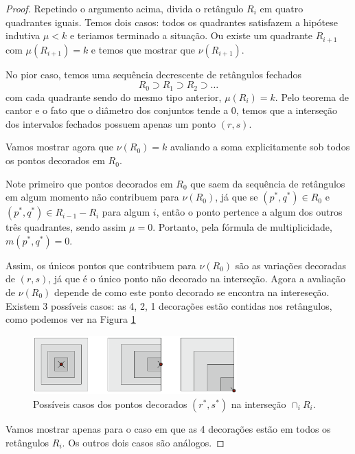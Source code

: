 \begin{proof}
Repetindo o argumento acima, divida o retângulo $R_i$ em quatro quadrantes iguais. Temos dois
casos: todos os quadrantes satisfazem a hipótese indutiva $\mu<k$ e teriamos terminado a situação.
Ou existe um quadrante $R_{i+1}$ com $\mu(R_{i+1})=k$ e temos que mostrar que $\nu(R_{i+1})$.

No pior caso, temos uma sequência decrescente de retângulos fechados
\begin{equation*}
    R_0 \supset R_1 \supset R_2 \supset \dots
\end{equation*}
com cada quadrante sendo do mesmo tipo anterior, $\mu(R_i) = k$. Pelo teorema de cantor e o fato
que o diâmetro dos conjuntos tende a $0$, temos que a interseção dos intervalos fechados possuem
apenas um ponto $(r,s)$.

Vamos mostrar agora que $\nu(R_0) = k$ avaliando a soma explicitamente sob todos os pontos decorados
em $R_0$.

Note primeiro que pontos decorados em $R_0$ que saem da sequência de retângulos em algum momento não
contribuem para $\nu(R_0)$, já que se $(p^*, q^*) \in R_0$ e $(p^*, q^*) \in R_{i-1} - R_i$ para 
algum $i$, então o ponto pertence a algum dos outros três quadrantes, sendo assim $\mu = 0$. 
Portanto, pela fórmula de multiplicidade, $m(p^*, q^*) = 0$. 

Assim, os únicos pontos que contribuem para $\nu(R_0)$ são as variações decoradas de $(r,s)$, já 
que é o único ponto não decorado na interseção. Agora a avaliação de $\nu(R_0)$ depende de como 
este ponto decorado se encontra na intereseção. Existem 3 possíveis casos: as 4, 2, 1 decorações
estão contidas nos retângulos, como podemos ver na Figura \ref{fig:proof_rect}

\begin{figure}[htpb!]
    \centering
    \includegraphics[width=0.7\textwidth]{images/proof_rect.png}
    \caption{Possíveis casos dos pontos decorados $(r^*, s^*)$ na interseção $\cap_i R_i$.}
    \label{fig:proof_rect}
\end{figure}

Vamos mostrar apenas para o caso em que as 4 decorações estão em todos os retângulos $R_i$. Os outros
dois casos são análogos. 


\end{proof}
